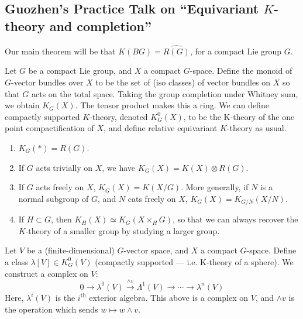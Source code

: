 \documentclass[11pt]{article}
\newcommand{\KanSemResponse}[1]
{
\thispagestyle{fancy}
\subsection*{#1}
}
\begin{document}
\begin{GuozhenEqKthyPractice}
\KanSemResponse
{Guozhen's Practice Talk on ``Equivariant $K$-theory and completion''}
Our main theorem will be that $K(BG)=\widehat{R(G)}$, for a compact Lie group $G$.

\begin{defn*}Let $G$ be a compact Lie group, and $X$ a compact $G$-space. Define the monoid of $G$-vector bundles over $X$ to be the set of (iso classes) of vector bundles on $X$ so that $G$ acts on the total space. Taking the group completion under Whitney sum, we obtain $K_G(X)$. The tensor product makes this a ring. We can define compactly supported $K$-theory, denoted $K^0_G(X)$, to be the K-theory of the one point compactification of $X$, and define relative equivariant $K$-theory as usual.
\end{defn*}
\begin{enumerate}\squishlist
\item $K_G(*)=R(G)$. 
\item If $G$ acts trivially on $X$, we have $K_G(X)=K(X)\otimes R(G)$.
\item If $G$ acts freely on $X$, $K_G(X)=K(X/G)$. More generally, if $N$ is a normal subgroup of $G$, and $N$ cats freely on $X$, $K_G(X)=K_{G/N}(X/N)$.
\item If $H\subset G$, then $K_H(X)\simeq K_G(X\times_H G)$, so that we can always recover the $K$-theory of a smaller group by studying a larger group.
\end{enumerate}
Let $V$ be a (finite-dimensional) $G$-vector space, and $X$ a compact $G$-space. Define a class $\lambda[V]\in K^0_G(V)$ (compactly supported --- i.e. K-theory of a sphere). We construct a complex on $V$:
\[0\to\lambda^0(V)\overset{\wedge v}{\to}\Lambda^1(V)\to\cdots\to \lambda^n(V)\]
Here, $\lambda^i(V)$ is the $i^\text{th}$ exterior algebra. This above is a complex on $V$, and $\wedge v$ is the operation which sends $w\mapsto w\wedge v$.


\end{GuozhenEqKthyPractice}
\end{document}

